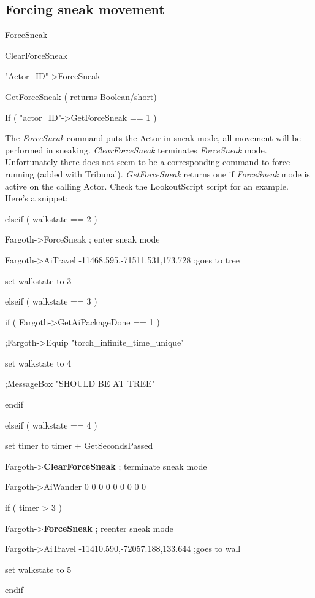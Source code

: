 \hypertarget{forcing-sneak-movement}{%
\subsection{Forcing sneak movement}\label{forcing-sneak-movement}}

ForceSneak

ClearForceSneak

"Actor\_ID"-\textgreater ForceSneak

GetForceSneak ( returns Boolean/short)

If ( "actor\_ID"-\textgreater GetForceSneak == 1 )

The \emph{ForceSneak} command puts the Actor in sneak mode, all movement
will be performed in sneaking. \emph{ClearForceSneak} terminates
\emph{ForceSneak} mode. Unfortunately there does not seem to be a
corresponding command to force running (added with Tribunal).
\emph{GetForceSneak} returns one if \emph{ForceSneak} mode is active on
the calling Actor. Check the LookoutScript script for an example. Here's
a snippet:

elseif ( walkstate == 2 )

Fargoth-\textgreater ForceSneak ; enter sneak mode

Fargoth-\textgreater AiTravel -11468.595,-71511.531,173.728 ;goes to
tree

set walkstate to 3

elseif ( walkstate == 3 )

if ( Fargoth-\textgreater GetAiPackageDone == 1 )

;Fargoth-\textgreater Equip "torch\_infinite\_time\_unique"

set walkstate to 4

;MessageBox "SHOULD BE AT TREE"

endif

elseif ( walkstate == 4 )

set timer to timer + GetSecondsPassed

Fargoth-\textgreater{}\textbf{ClearForceSneak} ; terminate sneak mode

Fargoth-\textgreater AiWander 0 0 0 0 0 0 0 0 0

if ( timer \textgreater{} 3 )

Fargoth-\textgreater{}\textbf{ForceSneak} ; reenter sneak mode

Fargoth-\textgreater AiTravel -11410.590,-72057.188,133.644 ;goes to
wall

set walkstate to 5

endif

